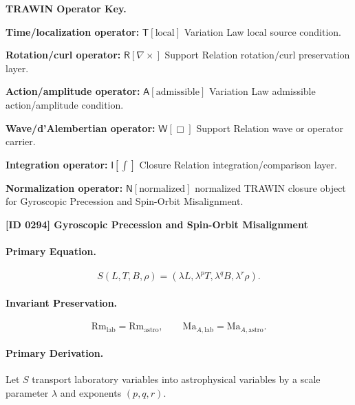 \par\vspace{0.45\baselineskip}
\noindent\begin{minipage}[t]{\linewidth}
\begingroup
\small
\raggedright
\textbf{TRAWIN Operator Key.}\par
\noindent\textbf{Time/localization operator:} $\mathsf{T}\!\left[\mathrm{local}\right]$ Variation Law local source condition.\par
\noindent\textbf{Rotation/curl operator:} $\mathsf{R}\!\left[\nabla\times\right]$ Support Relation rotation/curl preservation layer.\par
\noindent\textbf{Action/amplitude operator:} $\mathsf{A}\!\left[\mathrm{admissible}\right]$ Variation Law admissible action/amplitude condition.\par
\noindent\textbf{Wave/d'Alembertian operator:} $\mathsf{W}\!\left[\Box\right]$ Support Relation wave or operator carrier.\par
\noindent\textbf{Integration operator:} $\mathsf{I}\!\left[\int\right]$ Closure Relation integration/comparison layer.\par
\noindent\textbf{Normalization operator:} $\mathsf{N}\!\left[\mathrm{normalized}\right]$ normalized TRAWIN closure object for Gyroscopic Precession and Spin-Orbit Misalignment.\par
\endgroup
\end{minipage}

\clearpage
\noindent\textbf{[ID 0294] Gyroscopic Precession and Spin-Orbit Misalignment}\par
\vspace{0.35em}
\paragraph{Primary Equation.}
\begin{equation}
S(L,T,B,\rho)
=
(\lambda L,\lambda^{p}T,\lambda^{q}B,\lambda^{r}\rho).
\end{equation}

\paragraph{Invariant Preservation.}
\begin{equation}
\mathrm{Rm}_{\mathrm{lab}}=\mathrm{Rm}_{\mathrm{astro}},
\qquad
\mathrm{Ma}_{A,\mathrm{lab}}=\mathrm{Ma}_{A,\mathrm{astro}}.
\end{equation}

\paragraph{Primary Derivation.}
Let $S$ transport laboratory variables into astrophysical variables by a scale parameter $\lambda$ and exponents $(p,q,r)$.

